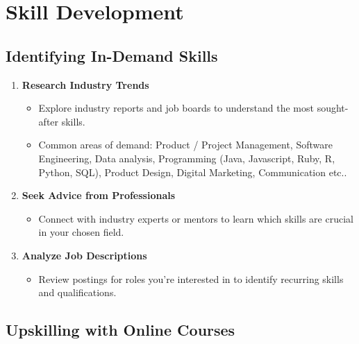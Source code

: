 \documentclass[
  letterpaper,
  DIV=11,
  numbers=noendperiod]{scrreprt}
\providecommand{\tightlist}{%
  \setlength{\itemsep}{0pt}\setlength{\parskip}{0pt}}\usepackage{longtable,booktabs,array}
\begin{document}

\chapter{Skill Development}\label{skill-development}

\section{Identifying In-Demand
Skills}\label{identifying-in-demand-skills}

\begin{enumerate}
\def\labelenumi{\arabic{enumi}.}
\item
  \textbf{Research Industry Trends}

  \begin{itemize}
  \tightlist
  \item
    Explore industry reports and job boards to understand the most
    sought-after skills.
  \item
    Common areas of demand: Product / Project Management, Software
    Engineering, Data analysis, Programming (Java, Javascript, Ruby, R,
    Python, SQL), Product Design, Digital Marketing, Communication etc..
  \end{itemize}
\item
  \textbf{Seek Advice from Professionals}

  \begin{itemize}
  \tightlist
  \item
    Connect with industry experts or mentors to learn which skills are
    crucial in your chosen field.
  \end{itemize}
\item
  \textbf{Analyze Job Descriptions}

  \begin{itemize}
  \tightlist
  \item
    Review postings for roles you're interested in to identify recurring
    skills and qualifications.
  \end{itemize}
\end{enumerate}

\section{Upskilling with Online
Courses}\label{upskilling-with-online-courses}
\end{document}
